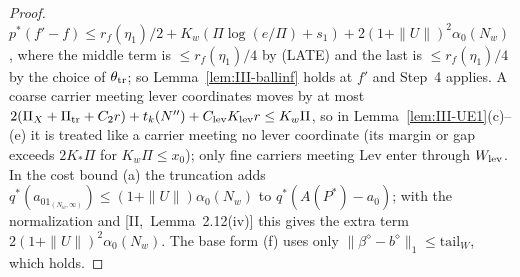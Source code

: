 \documentclass[10pt]{amsart}
\theoremstyle{definition}
\theoremstyle{remark}
\begin{document}
\begin{proof}
$p^*(f'-f)\le r_f(\eta_1)/2+K_w(\Pi\log(e/\Pi)+s_1)+2(1+\|U\|)^2\alpha_0(N_w)$,
where the middle term is $\le r_f(\eta_1)/4$ by (LATE) and the last is
$\le r_f(\eta_1)/4$ by the choice of $\theta_{\rm tr}$; so Lemma~\ref{lem:III-ballinf}
holds at $f'$ and Step~4 applies.  A coarse carrier meeting lever
coordinates moves by at most $2(\Pi_X+\Pi_{\rm tr}+C_2r)+t_k(N'')+C_{\rm lev}
K_{\rm lev}r\le K_w\Pi$, so in Lemma~\ref{lem:III-UE1}(c)--(e) it is treated like
a carrier meeting no lever coordinate (its margin or gap exceeds $2K_*\Pi$ for
$K_w\Pi\le x_0$); only fine carriers meeting $\mathrm{Lev}$ enter through
$W_{\rm lev}$.  In the cost bound (a) the truncation
adds $q^*(a_01_{(N_w,\infty)})\le(1+\|U\|)\alpha_0(N_w)$ to $q^*(A(P^*)-a_0)$;
with the normalization and [II,~Lemma~2.12(iv)] this gives the extra term
$2(1+\|U\|)^2\alpha_0(N_w)$.  The base form (f) uses only $\|\beta^\diamond-
b^\diamond\|_1\le\mathrm{tail}_W$, which holds.


\end{proof}
\end{document}
